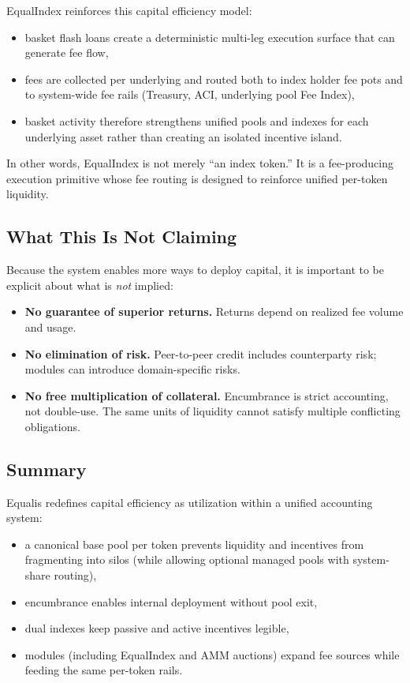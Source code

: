\documentclass[version=preprint]{iacrcc}
\begin{document}
EqualIndex reinforces this capital efficiency model:
\begin{itemize}
  \item basket flash loans create a deterministic multi-leg execution surface that can generate fee flow,
  \item fees are collected per underlying and routed both to index holder fee pots and to system-wide fee rails (Treasury, ACI, underlying pool Fee Index),
  \item basket activity therefore strengthens unified pools and indexes for each underlying asset rather than creating an isolated incentive island.
\end{itemize}

In other words, EqualIndex is not merely ``an index token.'' It is a fee-producing execution primitive whose fee routing is designed to reinforce unified per-token liquidity.

\subsection{What This Is Not Claiming}

Because the system enables more ways to deploy capital, it is important to be explicit about what is \emph{not} implied:
\begin{itemize}
  \item \textbf{No guarantee of superior returns.} Returns depend on realized fee volume and usage.
  \item \textbf{No elimination of risk.} Peer-to-peer credit includes counterparty risk; modules can introduce domain-specific risks.
  \item \textbf{No free multiplication of collateral.} Encumbrance is strict accounting, not double-use. The same units of liquidity cannot satisfy multiple conflicting obligations.
\end{itemize}

\subsection{Summary}

Equalis redefines capital efficiency as utilization within a unified accounting system:
\begin{itemize}
  \item a canonical base pool per token prevents liquidity and incentives from fragmenting into silos (while allowing optional managed pools with system-share routing),
  \item encumbrance enables internal deployment without pool exit,
  \item dual indexes keep passive and active incentives legible,
  \item modules (including EqualIndex and AMM auctions) expand fee sources while feeding the same per-token rails.
\end{itemize}
\end{document}
